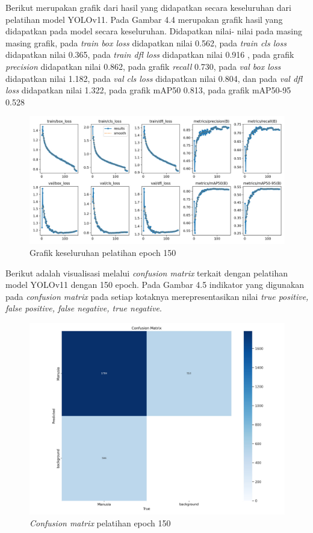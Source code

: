 Berikut merupakan grafik dari hasil yang didapatkan secara keseluruhan dari pelatihan model YOLOv11. Pada Gambar 4.4 merupakan grafik hasil yang didapatkan pada model secara keseluruhan. Didapatkan nilai- nilai pada masing masing grafik, pada \emph{train box loss} didapatkan nilai 0.562, pada \emph{train cls loss} didapatkan nilai 0.365, pada \emph{train dfl loss} didapatkan nilai 0.916 , pada grafik \emph{precision} didapatkan nilai 0.862, pada grafik \emph{recall} 0.730, pada \emph{val box loss} didapatkan nilai 1.182, pada \emph{val cls loss} didapatkan nilai 0.804, dan pada \emph{val dfl loss} didapatkan nilai 1.322,  pada grafik mAP50 0.813, pada grafik mAP50-95 0.528

\begin{figure} [H] \centering
  \includegraphics[scale=0.18]{gambar/Hasil.jpg}
  \caption{Grafik keseluruhan pelatihan epoch 150}
  \label{fig:Hasil pelatihan epoch 150}
\end{figure}

Berikut adalah visualisasi melalui \emph{confusion matrix} terkait dengan pelatihan model YOLOv11 dengan 150 epoch.
Pada Gambar 4.5 indikator yang digunakan pada \emph{confusion matrix} pada setiap kotaknya merepresentasikan nilai \emph{true positive, false positive, false negative, true negative}.
\begin{figure} [H] \centering
  \includegraphics[scale=0.12]{gambar/Confusion matrix yolov11.jpg}
  \caption{\emph{Confusion matrix} pelatihan epoch 150}
  \label{fig:Pengujian Performa}
\end{figure}

